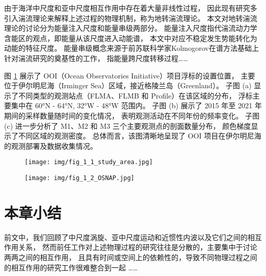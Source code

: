 由于海洋中尺度和亚中尺度相互作用中存在着大量非线性过程，
因此现有研究多引入湍流理论来解释上述过程的物理机制，称为地转湍流理论。
本文对地转湍流理论的讨论分为能量注入尺度和能量串级两部分。
能量注入尺度指代湍流动力学含能区的观点，即能量从该尺度进入动能谱，
本文中对应不稳定发生势能转化为动能的特征尺度。
能量串级概念来源于前苏联科学家Kolmogorov在谱方法基础上针对湍流研究的奠基性的工作，
指能量跨尺度转移过程……

图 \ref{fig:study-area} 展示了 OOI（Ocean Observatories Initiative）项目浮标的设置位置，
主要位于伊尔明尼海（Irminger Sea）区域，接近格陵兰岛（Greenland）。
子图 (a) 显示了不同类型的观测站点（FLMA、FLMB 和 Profile）在该区域的分布，
浮标主要集中在 60°N - 64°N, 32°W - 48°W 范围内。
子图 (b) 展示了 2015 年至 2021 年期间的采样数量随时间的变化情况，
表明观测活动在不同年份的频率变化。
子图 (c) 进一步分析了 M1、M2 和 M3 三个主要观测点的剖面数量分布，
颜色梯度显示了不同区域的观测密度。
总体而言，该图清晰地呈现了 OOI 项目在伊尔明尼海的观测部署及数据收集情况。

\begin{figure}[htbp]
  \centering
  \texttt{[image: img/fig\_1\_1\_study\_area.jpg]}
  \label{fig:study-area}
\end{figure}

\begin{figure}[htbp]
  \centering
  \texttt{[image: img/fig\_1\_2\_OSNAP.jpg]}
  \label{fig:enter-label-2}
\end{figure}

\section{本章小结}

前文中，我们回顾了中尺度涡旋、亚中尺度运动和近惯性内波以及它们之间的相互作用关系，
然而前任工作对上述物理过程的研究往往是分散的，主要集中于讨论两两之间的相互作用，
且具有时间或空间上的依赖性的，导致不同物理过程之间的相互作用的研究工作很难整合到一起
……